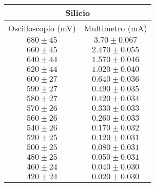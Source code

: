 \documentclass[@MAIN@]{subfiles}
\begin{document}
\begin{tabular}{ ||c|c|| }
  \hline
  \multicolumn{2}{||c||}{Silicio}\\
  \hline
  Oscilloscopio (mV) & Multimetro (mA) \\
  \hline
  $680\pm 45$ & $3.70\pm0.067$ \\
  \hline
  $660\pm 45$ & $2.470\pm0.055$ \\
  \hline
  $640\pm 44$ & $1.570\pm0.046$ \\
  \hline
  $620\pm 44$ & $1.020\pm0.040$\\
  \hline
  $600\pm 27$ & $0.640\pm0.036$ \\
  \hline
  $590\pm 27$ & $0.490\pm0.035$ \\
  \hline
  $580\pm 27$ & $0.420\pm0.034$ \\
  \hline
  $570\pm 26$ & $0.330\pm0.033$ \\
  \hline
  $560\pm 26$ & $0.260\pm0.033$ \\
  \hline
  $540\pm 26$ & $0.170\pm0.032$ \\
  \hline
  $520\pm 25$ & $0.120\pm0.031$ \\
  \hline 
  $500\pm 25$ & $0.080\pm0.031$ \\
  \hline 
  $480\pm 25$ & $0.050\pm0.031$ \\
  \hline 
  $460\pm 24$ & $0.040\pm0.030$ \\
  \hline 
  $420\pm 24$ & $0.020\pm0.030$ \\
  \hline 
  
\end{tabular}   
\end{document}
